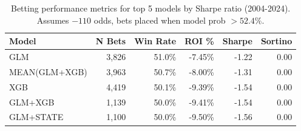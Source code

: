 \begin{table}[t]
\begin{keytable}
  \centering
  \small
  \caption[Betting performance metrics]{Betting performance metrics for top 5 models by Sharpe ratio (2004-2024). Assumes $-110$ odds, bets placed when model prob $> 52.4\%$.}
  \label{tab:betting-performance}
  \setlength{\tabcolsep}{3pt}\renewcommand{\arraystretch}{1.12}
  \begin{tabular}{@{} l r r r r r @{} }
    \toprule
    \textbf{Model}  & \textbf{N Bets}  & \textbf{Win Rate}  & \textbf{ROI \%}  & \textbf{Sharpe}  & \textbf{Sortino} \\
    \midrule
    GLM & 3,826 & 51.0\% & -7.45\% & -1.22 & 0.00 \\
    MEAN(GLM+XGB) & 3,963 & 50.7\% & -8.00\% & -1.31 & 0.00 \\
    XGB & 4,419 & 50.1\% & -9.39\% & -1.54 & 0.00 \\
    GLM+XGB & 1,139 & 50.0\% & -9.41\% & -1.54 & 0.00 \\
    GLM+STATE & 1,100 & 50.0\% & -9.50\% & -1.56 & 0.00 \\
    \bottomrule
  \end{tabular}
\end{keytable}
\end{table}
